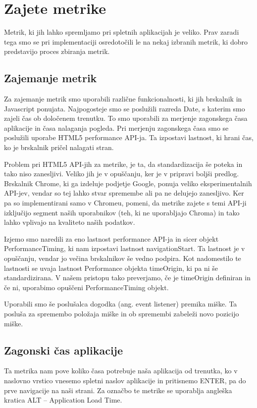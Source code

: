 \documentclass[a4paper, 12pt]{book}
\begin{document}
\chapter{Zajete metrike}
\label{ch2}

Metrik, ki jih lahko spremljamo pri spletnih aplikacijah je veliko. Prav zaradi tega smo se pri implementaciji osredotočili le na nekaj izbranih metrik, ki dobro predstavijo proces zbiranja metrik. 

\section{Zajemanje metrik}

Za zajemanje metrik smo uporabili različne funkcionalnosti, ki jih brskalnik in Javascript ponujata. Najpogosteje smo se poslužili razreda Date, s katerim smo zajeli čas ob določenem trenutku. To smo uporabili za merjenje zagonskega časa aplikacije in časa nalaganja pogleda. Pri merjenju zagonskega časa smo se poslužili uporabe HTML5 performance API-ja. Ta izpostavi lastnost, ki hrani čas, ko je brskalnik pričel nalagati stran.

Problem pri HTML5 API-jih za metrike, je ta, da standardizacija še poteka in tako niso zanesljivi. Veliko jih je v opuščanju, ker je v pripravi boljši predlog. Brskalnik Chrome, ki ga izdeluje podjetje Google, ponuja veliko eksperimentalnih API-jev, vendar so tej lahko stvar spremembe ali pa ne delujejo zanesljivo. Ker pa so implementirani samo v Chromeu, pomeni, da metrike zajete s temi API-ji izključijo segment naših uporabnikov (teh, ki ne uporabljajo Chroma) in tako lahko vplivajo na kvaliteto naših podatkov.

Izjemo smo naredili za eno lastnost performance API-ja in sicer objekt PerformanceTiming, ki nam izpostavi lastnost navigationStart. Ta lastnost je v opuščanju, vendar jo večina brskalnikov še vedno podpira. Kot nadomestilo te lastnosti se uvaja lastnost Performance objekta timeOrigin, ki pa ni še standardizirana. V našem pristopu tako preverjamo, če je timeOrigin definiran in če ni, uporabimo opuščeni PerformanceTiming objekt.

Uporabili smo še poslušalca dogodka (ang. event listener) premika miške. Ta posluša za spremembo položaja miške in ob spremembi zabeleži novo pozicijo miške.

\section{Zagonski čas aplikacije}
\label{ch2:sec1}
Ta metrika nam pove koliko časa potrebuje naša aplikacija od trenutka, ko v naslovno vrstico vnesemo spletni naslov aplikacije in pritisnemo ENTER, pa do prve navigacije na naši strani. Za označbo te metrike se uporablja angleška kratica ALT – Application Load Time.
\end{document}
